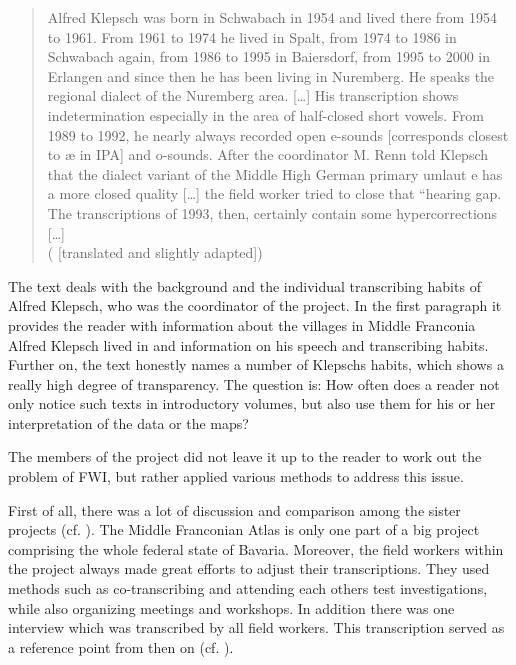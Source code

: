 \documentclass[output=paper]{LSP/langsci}
\begin{document}
\begin{quote}
Alfred Klepsch was born in Schwabach in 1954 and lived there from 1954 to 1961. From 1961 to 1974 he lived in Spalt, from 1974 to 1986 in Schwabach again, from 1986 to 1995 in Baiersdorf, from 1995 to 2000 in Erlangen and since then he has been living in Nuremberg. He speaks the regional dialect of the Nuremberg area. […] His transcription shows indetermination especially in the area of half-closed short vowels. From 1989 to 1992, he nearly always recorded open e-sounds [corresponds closest to æ in IPA] and o-sounds. After the coordinator M. Renn told Klepsch that the dialect variant of the Middle High German primary umlaut e has a more closed quality […] the field worker tried to close that ``hearing gap{\textquotedbl}. The transcriptions of 1993, then, certainly contain some hypercorrections […]\\(\citealt[47]{klepsch_sprachatlas_2013} [translated and slightly adapted])
\end{quote}

The text deals with the background and the individual transcribing habits of Alfred Klepsch, who was the coordinator of the project. In the first paragraph it provides the reader with information about the villages in Middle Franconia Alfred Klepsch lived in and information on his speech and transcribing habits. Further on, the text honestly names a number of Klepsch{\textquotesingle}s habits, which shows a really high degree of transparency. The question is: How often does a reader not only notice such texts in introductory volumes, but also use them for his or her interpretation of the data or the maps?

The members of the project did not leave it up to the reader to work out the problem of FWI, but rather applied various methods to address this issue.

First of all, there was a lot of discussion and comparison among the sister projects (cf. \citealt[25 ff.]{klepsch_wie_2013}). The Middle Franconian Atlas is only one part of a big project comprising the whole federal state of Bavaria. Moreover, the field workers within the project always made great efforts to adjust their transcriptions. They used methods such as co-transcribing and attending each other{\textquotesingle}s test investigations, while also organizing meetings and workshops. In addition there was one interview which was transcribed by all field workers. This transcription served as a reference point from then on (cf. \citealt[26]{klepsch_wie_2013}).
\end{document}
